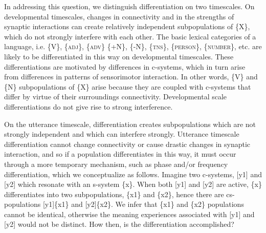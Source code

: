   In addressing this question, we distinguish differentiation on two timescales. On developmental timescales, changes in connectivity and in the strengths of synaptic interactions can create relatively independent subpopulations of \{X\}, which do not strongly interfere with each other. The basic lexical categories of a language, i.e. \{V\}, \{\textsc{adj}\}, \{\textsc{adv}\} \{+N\}, \{-N\}, \{\textsc{tns}\}, \{\textsc{person}\}, \{\textsc{number}\}, etc. are likely to be differentiated in this way on developmental timescales. These differentiations are motivated by differences in c-systems, which in turn arise from differences in patterns of sensorimotor interaction. In other words, \{V\} and \{N\} subpopulations of \{X\} arise because they are coupled with c-systems that differ by virtue of their surroundings connectivity. Developmental scale differentiations do not give rise to strong interference.

  On the utterance timescale, differentiation creates subpopulations which are not strongly independent and which can interfere strongly. Utterance timescale differentiation cannot change connectivity or cause drastic changes in synaptic interaction, and so if a population differentiates in this way, it must occur through a more temporary mechanism, such as phase and/or frequency differentiation, which we conceptualize as follows. Imagine two c-systems, [y1] and [y2] which resonate with an s-system \{x\}. When both [y1] and [y2] are active, \{x\} differentiates into two subpopulations, \{x1\} and \{x2\}, hence there are cs-populations [y1]\{x1\} and [y2]\{x2\}. We infer that \{x1\} and \{x2\} populations cannot be identical, otherwise the meaning experiences associated with [y1] and [y2] would not be distinct. How then, is the differentiation accomplished? 

